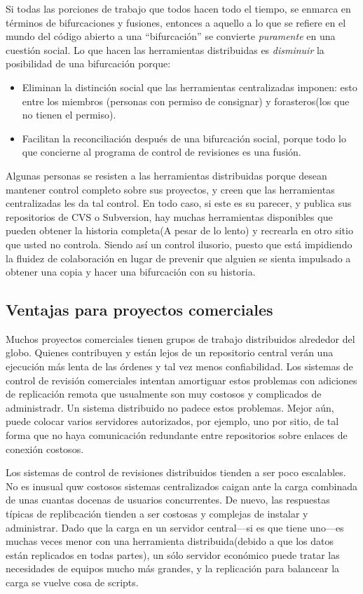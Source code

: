 Si todas las porciones de trabajo que todos hacen todo el tiempo, se
enmarca en términos de bifurcaciones y fusiones, entonces a aquello a
lo que se refiere en el mundo del código abierto a una ``bifurcación''
se convierte \emph{puramente} en una cuestión social. Lo que hacen las
herramientas distribuidas es \emph{disminuir} la posibilidad de una
bifurcación porque:
\begin{itemize}
\item Eliminan la distinción social que las herramientas centralizadas
  imponen: esto entre los miembros (personas con permiso de consignar)
  y forasteros(los que no tienen el permiso).
\item Facilitan la reconciliación después de una bifurcación social,
  porque todo lo que concierne al programa de control de revisiones es
  una fusión.
\end{itemize}

Algunas personas se resisten a las herramientas distribuidas porque
desean mantener control completo sobre sus proyectos, y creen que las
herramientas centralizadas les da tal control. En todo caso, si este
es su parecer, y publica sus repositorios de CVS o Subversion, hay
muchas herramientas disponibles que pueden obtener la historia
completa(A pesar de lo lento) y recrearla en otro sitio que usted no
controla. Siendo así un control ilusorio, puesto que está impidiendo
la fluidez de colaboración en lugar de prevenir que alguien se sienta
impulsado a obtener una copia y hacer una bifurcación con su historia.

\subsection{Ventajas para proyectos comerciales}

Muchos proyectos comerciales tienen grupos de trabajo distribuidos
alrededor del globo.  Quienes contribuyen y están lejos de un
repositorio central verán una ejecución más lenta de las órdenes y tal
vez menos confiabilidad. Los sistemas de control de revisión
comerciales intentan amortiguar estos problemas con adiciones de
replicación remota que usualmente son muy costosos y complicados de
administradr. Un sistema distribuido no padece estos problemas. Mejor
aún, puede colocar varios servidores autorizados, por ejemplo, uno por
sitio, de tal forma que no haya comunicación redundante entre
repositorios sobre enlaces de conexión costosos.

Los sistemas de control de revisiones distribuidos tienden a ser poco
escalables. No es inusual quw costosos sistemas centralizados caigan
ante la carga combinada de unas cuantas docenas de usuarios
concurrentes. De nuevo, las respuestas típicas de replibcación tienden
a ser costosas y complejas de instalar y administrar. Dado que la
carga en un servidor central---si es que tiene uno---es muchas veces
menor con una herramienta distribuida(debido a que los datos están
replicados en todas partes), un sólo servidor económico puede tratar
las necesidades de equipos mucho más grandes, y la replicación para
balancear la carga se vuelve cosa de scripts.

